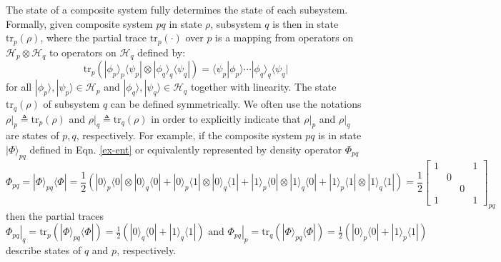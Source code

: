 \documentclass[conference,compsoc, 10pt]{IEEEtran}
\newcommand {\cH } {{\mathcal{H}}}
\newcommand {\rt }[2] {{\left.{#1}\right|_{#2}}}
\newcommand {\tr } {{\mathrm{tr}}}
\def\>{\ensuremath{\rangle}}
\def\<{\ensuremath{\langle}}
\begin{document}
\begin{appendices}
		The state of a composite system fully determines the state of each subsystem.
		Formally, given composite system $pq$ in state $\rho$, subsystem $q$ is then
		in state $\tr_p(\rho)$, where the partial trace $\tr_p(\cdot)$ over $p$ is a
		mapping from operators on $\cH_p\otimes\cH_q$ to operators on $\cH_q$ defined
		by: $$\tr_p(|\phi_p\>_p\<\psi_p|\otimes|\phi_q\>_q\<\psi_q|) =
		\<\psi_p|\phi_p\>\cdots|\phi_q\>_q\<\psi_q|$$  for all
		$|\phi_p\>,|\psi_p\>\in\cH_p$ and $|\phi_q\>,|\psi_q\>\in\cH_q$ together with
		linearity. The state $\tr_q(\rho)$ of subsystem $q$ can be defined
		symmetrically.  We often use the notations $\rt{\rho}{p} \triangleq
		\tr_p(\rho)$ and $\rt{\rho}{q} \triangleq \tr_q(\rho)$ in order to explicitly
		indicate that $\rt{\rho}{p}$ and  $\rt{\rho}{q}$ are states of $p,q$,
		respectively. For example, if the composite system $pq$ is in state $
		|\Phi\rangle_{pq}$ defined in Eqn. \ref{ex-ent} or equivalently represented by density operator $\Phi_{pq}$ \begin{equation}\label{max-ent}\Phi_{pq} = |\Phi\>_{pq}\<\Phi| = \frac{1}{2}(|0\>_p\<0|\otimes|0\>_q\<0|+ |0\>_p\<1|\otimes|0\>_q\<1|+|1\>_p\<0|\otimes|1\>_q\<0|+|1\>_p\<1|\otimes|1\>_q\<1|)
		= \frac{1}{2}\left[\begin{array}{cccc} 1 & & & 1\\ & 0 & & \\ & & 0 & \\ 1 & & & 1\end{array} \right]_{pq}
		\end{equation} then the partial traces $\rt{\Phi_{pq}}{q} = \tr_p(|\Phi\>_{pq}\<\Phi|) = \frac{1}{2}(|0\>_q\<0|+|1\>_q\<1|) \text{\ and\ } \rt{\Phi_{pq}}{p} = \tr_q(|\Phi\>_{pq}\<\Phi|) = \frac{1}{2}(|0\>_p\<0|+|1\>_p\<1|)$
		describe states of $q$ and $p$, respectively.
		

\end{appendices}
\end{document}
